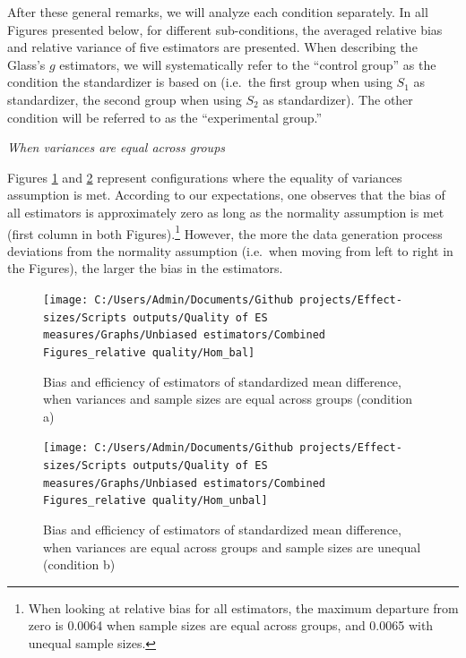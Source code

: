 \documentclass[
  english,
  man]{apa6}
\begin{document}
After these general remarks, we will analyze each condition separately. In all Figures presented below, for different sub-conditions, the averaged relative bias and relative variance of five estimators are presented. When describing the Glass's \(g\) estimators, we will systematically refer to the ``control group'' as the condition the standardizer is based on (i.e.~the first group when using \(S_1\) as standardizer, the second group when using \(S_2\) as standardizer). The other condition will be referred to as the ``experimental group.''

\emph{When variances are equal across groups}

Figures \ref{fig:idHombal} and \ref{fig:idHomunbal} represent configurations where the equality of variances assumption is met. According to our expectations, one observes that the bias of all estimators is approximately zero as long as the normality assumption is met (first column in both Figures).\footnote{When looking at relative bias for all estimators, the maximum departure from zero is 0.0064 when sample sizes are equal across groups, and 0.0065 with unequal sample sizes.} However, the more the data generation process deviations from the normality assumption (i.e.~when moving from left to right in the Figures), the larger the bias in the estimators.

\newpage
\blandscape
\begin{figure}

{\centering \texttt{[image: C:/Users/Admin/Documents/Github projects/Effect-sizes/Scripts outputs/Quality of ES measures/Graphs/Unbiased estimators/Combined Figures\_relative quality/Hom\_bal]} 

}

\caption{Bias and efficiency of estimators of standardized mean difference, when variances and sample sizes are equal across groups (condition a)}\label{fig:idHombal}
\end{figure}
\blandscape
\begin{figure}

{\centering \texttt{[image: C:/Users/Admin/Documents/Github projects/Effect-sizes/Scripts outputs/Quality of ES measures/Graphs/Unbiased estimators/Combined Figures\_relative quality/Hom\_unbal]} 

}

\caption{Bias and efficiency of estimators of standardized mean difference, when variances are equal across groups and sample sizes are unequal (condition b)}\label{fig:idHomunbal}
\end{figure}
\newpage
\elandscape
\end{document}
